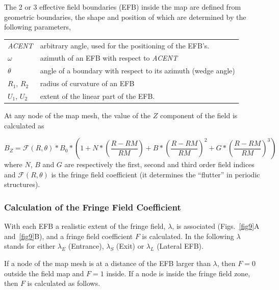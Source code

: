 \noindent The 2 or 3 effective field boundaries (EFB) inside the map are
defined from  geometric boundaries, the shape and position of which are determined by the 
following parameters, 


\begin{tabular}{l!{~:}l}
	 \textsl{ACENT} 
	    & arbitrary  angle, used for the positioning of the EFB's. \\
	$\omega$ &  azimuth of an EFB with respect to  \textsl{ACENT}\\
	$\theta$ & angle of a boundary with respect to its azimuth (wedge angle)\\ 
	$R_1$, $R_2$  &  radius of curvature of an EFB\\
	$U_1$, $U_2$  &  extent of the linear part of the EFB. 
\end{tabular}
\bigskip

\noindent At  any node  of the map mesh, the value of the $Z$ 
component of the field is calculated as 

 \begin{equation}
	 B_Z =  \mathcal{F}(R,\theta) \ast  B_0 \ast  
	      \left(1+N \ast  
	           \left( \dfrac{R-RM }{ RM}\right) 
	           + B \ast  \left(\dfrac{R-RM }{ RM} \right)^2 
	           + G \ast  \left(\dfrac{R-RM }{ RM} \right)^3 
	      \right) 
 	\label{eq4-4-1}
 \end{equation}
%
 where  $ N$, $B $ and $ G $ are  respectively  the first, second and
third order field indices and $ \mathcal{F}(R,\theta)$ is the fringe field 
coefficient  (it determines the ``flutter''  in periodic structures).  


\subsubsection*{Calculation of the Fringe Field Coefficient} 

With  each EFB a realistic extent of the fringe field, $\lambda$, 
is associated (Figs.~\ref{fig9}A and~\ref{fig9}B),  
and a fringe field coefficient $ F$ is 
calculated. In the following $\lambda$ stands for either $ \lambda_ E $
(Entrance), $ \lambda_ S $ (Exit) or $ \lambda_ L $ (Lateral EFB). 
 
\noindent If a node of the map mesh is at a distance of the EFB larger than
$\lambda$, then $  F=0 $ outside the field map and $ F=1 $ inside.  
If a node is inside the fringe field zone, then $  F$   is calculated as follows. 

\bigskip 

